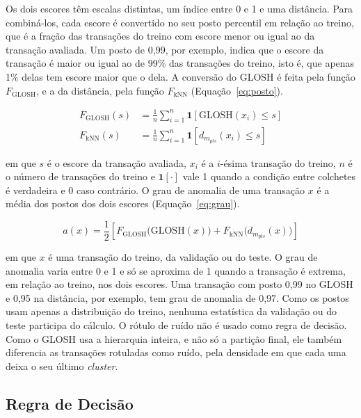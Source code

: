 \documentclass{uflamon}          %
\begin{document}
Os dois escores têm escalas distintas, um índice entre 0 e 1 e uma distância. Para combiná-los, cada escore é convertido no seu posto percentil em relação ao treino, que é a fração das transações do treino com escore menor ou igual ao da transação avaliada. Um posto de 0,99, por exemplo, indica que o escore da transação é maior ou igual ao de 99\% das transações do treino, isto é, que apenas 1\% delas tem escore maior que o dela. A conversão do GLOSH é feita pela função $F_{\mathrm{GLOSH}}$, e a da distância, pela função $F_{\mathrm{kNN}}$ (Equação~\ref{eq:posto}).

\begin{equation}
    \begin{aligned}
        F_{\mathrm{GLOSH}}(s) &= \frac{1}{n} \sum_{i=1}^{n} \mathbf{1}\left[\mathrm{GLOSH}(x_i) \le s\right] \\
        F_{\mathrm{kNN}}(s) &= \frac{1}{n} \sum_{i=1}^{n} \mathbf{1}\left[d_{m_{pts}}(x_i) \le s\right]
    \end{aligned}
    \label{eq:posto}
\end{equation}

em que $s$ é o escore da transação avaliada, $x_i$ é a $i$-ésima transação do treino, $n$ é o número de transações do treino e $\mathbf{1}[\cdot]$ vale 1 quando a condição entre colchetes é verdadeira e 0 caso contrário. O grau de anomalia de uma transação $x$ é a média dos postos dos dois escores (Equação~\ref{eq:grau}).

\begin{equation}
    a(x) = \frac{1}{2}\left[F_{\mathrm{GLOSH}}\big(\mathrm{GLOSH}(x)\big) + F_{\mathrm{kNN}}\big(d_{m_{pts}}(x)\big)\right]
    \label{eq:grau}
\end{equation}

em que $x$ é uma transação do treino, da validação ou do teste. O grau de anomalia varia entre 0 e 1 e só se aproxima de 1 quando a transação é extrema, em relação ao treino, nos dois escores. Uma transação com posto 0,99 no GLOSH e 0,95 na distância, por exemplo, tem grau de anomalia de 0,97. Como os postos usam apenas a distribuição do treino, nenhuma estatística da validação ou do teste participa do cálculo. O rótulo de ruído não é usado como regra de decisão. Como o GLOSH usa a hierarquia inteira, e não só a partição final, ele também diferencia as transações rotuladas como ruído, pela densidade em que cada uma deixa o seu último \textit{cluster}.

\subsection{Regra de Decisão}
\end{document}
